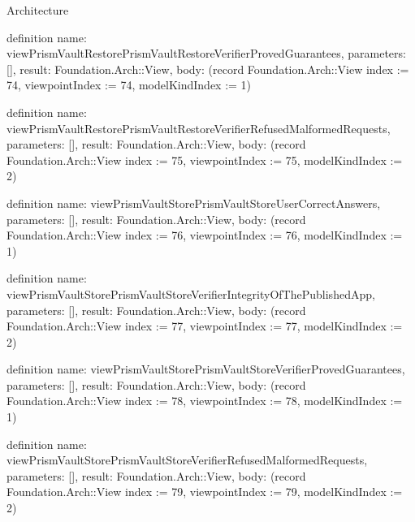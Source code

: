 \begin{lexlean}{Architecture}
\begin{semanticmodule}
definition{
  name: viewPrismVaultRestorePrismVaultRestoreVerifierProvedGuarantees,
  parameters: [],
  result: Foundation.Arch::View,
  body: (record Foundation.Arch::View {index := 74, viewpointIndex := 74, modelKindIndex := 1})
}

definition{
  name: viewPrismVaultRestorePrismVaultRestoreVerifierRefusedMalformedRequests,
  parameters: [],
  result: Foundation.Arch::View,
  body: (record Foundation.Arch::View {index := 75, viewpointIndex := 75, modelKindIndex := 2})
}

definition{
  name: viewPrismVaultStorePrismVaultStoreUserCorrectAnswers,
  parameters: [],
  result: Foundation.Arch::View,
  body: (record Foundation.Arch::View {index := 76, viewpointIndex := 76, modelKindIndex := 1})
}

definition{
  name: viewPrismVaultStorePrismVaultStoreVerifierIntegrityOfThePublishedApp,
  parameters: [],
  result: Foundation.Arch::View,
  body: (record Foundation.Arch::View {index := 77, viewpointIndex := 77, modelKindIndex := 2})
}

definition{
  name: viewPrismVaultStorePrismVaultStoreVerifierProvedGuarantees,
  parameters: [],
  result: Foundation.Arch::View,
  body: (record Foundation.Arch::View {index := 78, viewpointIndex := 78, modelKindIndex := 1})
}

definition{
  name: viewPrismVaultStorePrismVaultStoreVerifierRefusedMalformedRequests,
  parameters: [],
  result: Foundation.Arch::View,
  body: (record Foundation.Arch::View {index := 79, viewpointIndex := 79, modelKindIndex := 2})
}


\end{semanticmodule}
\end{lexlean}
